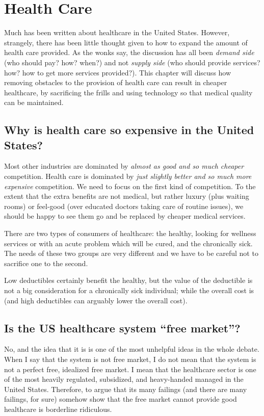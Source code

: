 \chapter{Health Care}
\label{chpt:health}

Much has been written about healthcare in the United States. However,
strangely, there has been little thought given to how to expand the amount of
health care provided. As the wonks say, the discussion has all been
\emph{demand side} (who should pay? how? when?) and not \emph{supply side} (who
should provide services? how? how to get more services provided?). This chapter
will discuss how removing obstacles to the provision of health care can result
in cheaper healthcare, by sacrificing the frills and using technology so that
medical quality can be maintained.

\section{Why is health care so expensive in the United States?}

Most other industries are dominated by \emph{almost as good and so much
cheaper} competition. Health care is dominated by \emph{just slightly better
and so much more expensive} competition. We need to focus on the first kind of
competition. To the extent that the extra benefits are not medical, but rather
luxury (plus waiting rooms) or feel-good (over educated doctors taking care of
routine issues), we should be happy to see them go and be replaced by cheaper
medical services.

There are two types of consumers of healthcare: the healthy, looking for
wellness services or with an acute problem which will be cured, and the
chronically sick. The needs of these two groups are very different and we have
to be careful not to sacrifice one to the second.

Low deductibles certainly benefit the healthy, but the value of the deductible
is not a big consideration for a chronically sick individual; while the overall
cost is (and high deductibles can arguably lower the overall cost).

\section{Is the US healthcare system ``free market''?}

No, and the idea that it is is one of the most unhelpful ideas in the whole
debate. When I say that the system is not free market, I do not mean that the
system is not a perfect free, idealized free market. I mean that the healthcare
sector is one of the most heavily regulated, subsidized, and heavy-handed
managed in the United States. Therefore, to argue that its many failings (and
there are many failings, for sure) somehow show that the free market cannot
provide good healthcare is borderline ridiculous.

